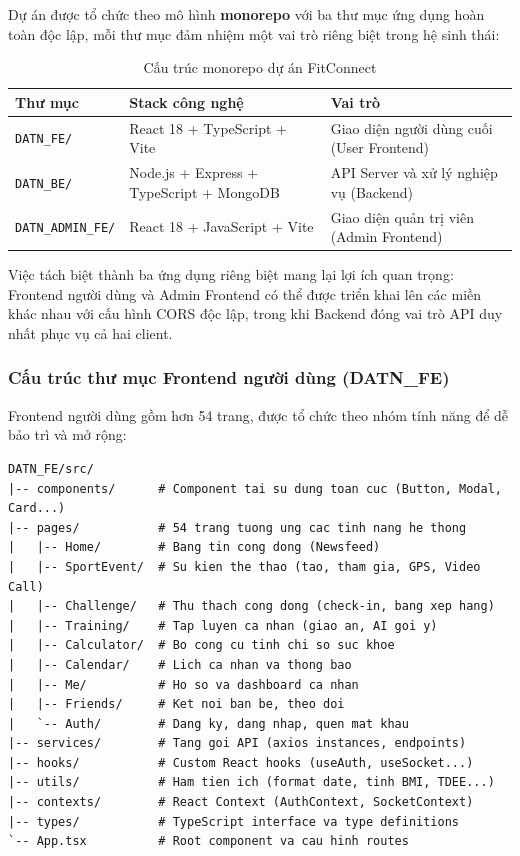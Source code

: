 Dự án được tổ chức theo mô hình \textbf{monorepo} với ba thư mục ứng dụng hoàn toàn độc lập, mỗi thư mục đảm nhiệm một vai trò riêng biệt trong hệ sinh thái:

\begin{table}[H]
\centering
\caption{Cấu trúc monorepo dự án FitConnect}
\label{tab:impl_monorepo}
\begin{tabular}{|p{3.5cm}|p{4.5cm}|p{6cm}|}
\hline
\textbf{Thư mục} & \textbf{Stack công nghệ} & \textbf{Vai trò} \\
\hline
\texttt{DATN\_FE/} & React 18 + TypeScript + Vite & Giao diện người dùng cuối (User Frontend) \\
\hline
\texttt{DATN\_BE/} & Node.js + Express + TypeScript + MongoDB & API Server và xử lý nghiệp vụ (Backend) \\
\hline
\texttt{DATN\_ADMIN\_FE/} & React 18 + JavaScript + Vite & Giao diện quản trị viên (Admin Frontend) \\
\hline
\end{tabular}
\end{table}

Việc tách biệt thành ba ứng dụng riêng biệt mang lại lợi ích quan trọng: Frontend người dùng và Admin Frontend có thể được triển khai lên các miền khác nhau với cấu hình CORS độc lập, trong khi Backend đóng vai trò API duy nhất phục vụ cả hai client.

\subsubsection{Cấu trúc thư mục Frontend người dùng (DATN\_FE)}
\label{subsubsec:impl_frontend_structure}

Frontend người dùng gồm hơn 54 trang, được tổ chức theo nhóm tính năng để dễ bảo trì và mở rộng:

\begin{lstlisting}[basicstyle=\ttfamily\small, frame=single, breaklines=true]
DATN_FE/src/
|-- components/      # Component tai su dung toan cuc (Button, Modal, Card...)
|-- pages/           # 54 trang tuong ung cac tinh nang he thong
|   |-- Home/        # Bang tin cong dong (Newsfeed)
|   |-- SportEvent/  # Su kien the thao (tao, tham gia, GPS, Video Call)
|   |-- Challenge/   # Thu thach cong dong (check-in, bang xep hang)
|   |-- Training/    # Tap luyen ca nhan (giao an, AI goi y)
|   |-- Calculator/  # Bo cong cu tinh chi so suc khoe
|   |-- Calendar/    # Lich ca nhan va thong bao
|   |-- Me/          # Ho so va dashboard ca nhan
|   |-- Friends/     # Ket noi ban be, theo doi
|   `-- Auth/        # Dang ky, dang nhap, quen mat khau
|-- services/        # Tang goi API (axios instances, endpoints)
|-- hooks/           # Custom React hooks (useAuth, useSocket...)
|-- utils/           # Ham tien ich (format date, tinh BMI, TDEE...)
|-- contexts/        # React Context (AuthContext, SocketContext)
|-- types/           # TypeScript interface va type definitions
`-- App.tsx          # Root component va cau hinh routes
\end{lstlisting}

